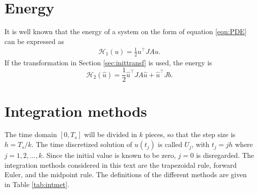 \section{Energy}%
\label{sec:energy}
It is well known that the energy of a system on the form of equation \eqref{eqn:PDE} can be expressed as \cite{energy}
\begin{equation*}
\begin{aligned}
\mathcal{H}_1(u) = \frac{1}{2} u^\top J A u.
\end{aligned}
\end{equation*}
\noindent If the transformation in Section \ref{sec:inittransf} is used, the energy is 
\begin{equation}
\mathcal{H}_2 (\hat{u}) = \frac{1}{2} \hat{u}^\top   J A \hat{u} + \hat{u}^\top  J b.
\label{eqn:energy2}
\end{equation}


\section{Integration methods}%
\noindent The time domain $[0,T_s]$ will be divided in $k$ pieces, so that the step size is $h = T_s/k$. The time discretized solution of $u(t_j)$ is called $U_j$, with $t_j = j h$ where $ j = 1,2,\dots,k $. Since the initial value is known to be zero, $j = 0$ is disregarded. %
The integration methods considered in this text are the trapezoidal rule, forward Euler, and the midpoint rule. The definitions of the different methods are given in Table \ref{tab:intmet}. \\

